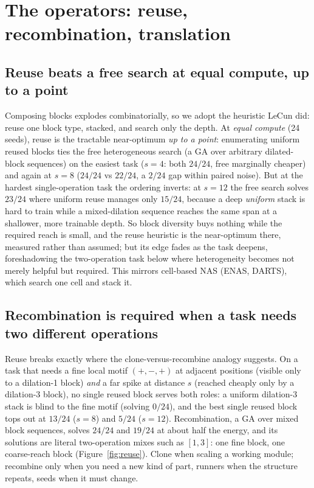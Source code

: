\documentclass[11pt]{article}
\begin{document}
\section{The operators: reuse, recombination, translation}

\subsection{Reuse beats a free search at equal compute, up to a point}\label{subsec:reuse}

Composing blocks explodes combinatorially, so we adopt the heuristic LeCun did: reuse one block type,
stacked, and search only the depth. At \emph{equal compute} (24 seeds), reuse is the tractable near-optimum
\emph{up to a point}: enumerating uniform reused blocks ties the free heterogeneous search (a GA over
arbitrary dilated-block sequences) on the easiest task ($s{=}4$: both $24/24$, free marginally cheaper) and
again at $s{=}8$ ($24/24$ vs $22/24$, a $2/24$ gap within paired noise). But at the hardest single-operation task the ordering
inverts: at $s{=}12$ the free search solves $23/24$ where uniform reuse manages only $15/24$, because a deep
\emph{uniform} stack is hard to train while a mixed-dilation sequence reaches the same span at a shallower,
more trainable depth. So block diversity buys nothing while the required reach is small, and the reuse
heuristic is the near-optimum there, measured rather than assumed; but its edge fades as the task deepens,
foreshadowing the two-operation task below
where heterogeneity becomes not merely helpful but required. This mirrors cell-based NAS (ENAS, DARTS),
which search one cell and stack it.

\subsection{Recombination is required when a task needs two different operations}

Reuse breaks exactly where the clone-versus-recombine analogy suggests. On a task that needs a fine local motif
$(+,-,+)$ at adjacent positions (visible only to a dilation-1 block) \emph{and} a far spike at distance
$s$ (reached cheaply only by a dilation-3 block), no single reused block serves both roles: a uniform
dilation-3 stack is blind to the fine motif (solving $0/24$), and the best single reused block tops out at
$13/24$ ($s{=}8$) and $5/24$ ($s{=}12$). Recombination, a GA over mixed block sequences, solves $24/24$ and
$19/24$ at about half the energy, and its solutions are literal two-operation mixes such as $[1,3]$: one
fine block, one coarse-reach block (Figure~\ref{fig:reuse}). Clone when scaling a working module; recombine only when you need a new kind of
part, runners when the structure repeats, seeds when it must change.
\end{document}
